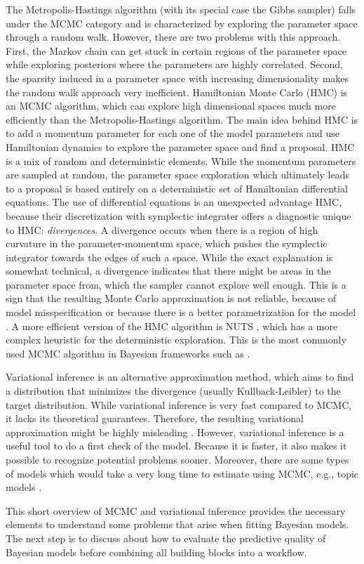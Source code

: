 The Metropolis-Hastings algorithm (with its special case the Gibbs sampler) falls under the MCMC category and is characterized by exploring the parameter space through a random walk.
However, there are two problems with this approach.
First, the Markov chain can get stuck in certain regions of the parameter space while exploring posteriors where the parameters are highly correlated.
Second, the sparsity induced in a parameter space with increasing dimensionality makes the random walk approach very inefficient.
Hamiltonian Monte Carlo (HMC) is an MCMC algorithm, which can explore high dimensional spaces much more efficiently than the Metropolis-Hastings algorithm.
The main idea behind HMC is to add a momentum parameter for each one of the model parameters and use Hamiltonian dynamics to explore the parameter space and find a proposal.
HMC is a mix of random and deterministic elements.
While the momentum parameters are sampled at random, the parameter space exploration which ultimately leads to a proposal is based entirely on a deterministic set of Hamiltonian differential equations.
The use of differential equations is an unexpected advantage HMC, because their discretization with symplectic integrater offers a diagnostic unique to HMC: \textit{divergences}.
A divergence occurs when there is a region of high curvature in the parameter-momentum space, which pushes the symplectic integrator towards the edges of such a space.
While the exact explanation is somewhat technical, a divergence indicates that there might be areas in the parameter space from, which the sampler cannot explore well enough.
This is a sign that the resulting Monte Carlo approximation is not reliable, because of model misspecification or because there is a better parametrization for the model \citep{betancourt_conceptual_2017, neal_mcmc_2011}.
A more efficient version of the HMC algorithm is NUTS \citep{hoffman_no-u-turn_2014}, which has a more complex heuristic for the deterministic exploration.
This is the most commonly used MCMC algorithm in Bayesian frameworks such as .

Variational inference is an alternative approximation method, which aims to find a distribution that minimizes the divergence (usually Kullback-Leibler) to the target distribution.
While variational inference is very fast compared to MCMC, it lacks its theoretical guarantees.
Therefore, the resulting variational approximation might be highly misleading \citep{blei_variational_2017}.
However, variational inference is a useful tool to do a first check of the model.
Because it is faster, it also makes it possible to recognize potential problems sooner.
Moreover, there are some types of models which would take a very long time to estimate using MCMC, e.g., topic models \citep{blei_latent_2003}.

This short overview of MCMC and variational inference provides the necessary elements to understand some problems that arise when fitting Bayesian models.
The next step is to discuss about how to evaluate the predictive quality of Bayesian models before combining all building blocks into a workflow.

